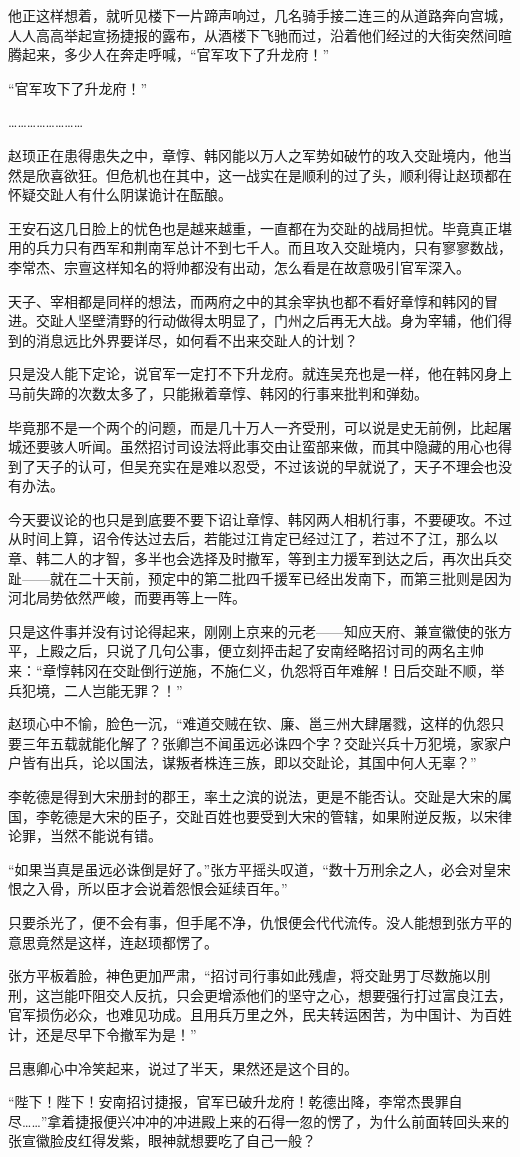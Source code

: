 他正这样想着，就听见楼下一片蹄声响过，几名骑手接二连三的从道路奔向宫城，人人高高举起宣扬捷报的露布，从酒楼下飞驰而过，沿着他们经过的大街突然间暄腾起来，多少人在奔走呼喊，“官军攻下了升龙府！”

“官军攻下了升龙府！”

……………………

赵顼正在患得患失之中，章惇、韩冈能以万人之军势如破竹的攻入交趾境内，他当然是欣喜欲狂。但危机也在其中，这一战实在是顺利的过了头，顺利得让赵顼都在怀疑交趾人有什么阴谋诡计在酝酿。

王安石这几日脸上的忧色也是越来越重，一直都在为交趾的战局担忧。毕竟真正堪用的兵力只有西军和荆南军总计不到七千人。而且攻入交趾境内，只有寥寥数战，李常杰、宗亶这样知名的将帅都没有出动，怎么看是在故意吸引官军深入。

天子、宰相都是同样的想法，而两府之中的其余宰执也都不看好章惇和韩冈的冒进。交趾人坚壁清野的行动做得太明显了，门州之后再无大战。身为宰辅，他们得到的消息远比外界要详尽，如何看不出来交趾人的计划？

只是没人能下定论，说官军一定打不下升龙府。就连吴充也是一样，他在韩冈身上马前失蹄的次数太多了，只能揪着章惇、韩冈的行事来批判和弹劾。

毕竟那不是一个两个的问题，而是几十万人一齐受刑，可以说是史无前例，比起屠城还要骇人听闻。虽然招讨司设法将此事交由让蛮部来做，而其中隐藏的用心也得到了天子的认可，但吴充实在是难以忍受，不过该说的早就说了，天子不理会也没有办法。

今天要议论的也只是到底要不要下诏让章惇、韩冈两人相机行事，不要硬攻。不过从时间上算，诏令传达过去后，若能过江肯定已经过江了，若过不了江，那么以章、韩二人的才智，多半也会选择及时撤军，等到主力援军到达之后，再次出兵交趾——就在二十天前，预定中的第二批四千援军已经出发南下，而第三批则是因为河北局势依然严峻，而要再等上一阵。

只是这件事并没有讨论得起来，刚刚上京来的元老——知应天府、兼宣徽使的张方平，上殿之后，只说了几句公事，便立刻抨击起了安南经略招讨司的两名主帅来：“章惇韩冈在交趾倒行逆施，不施仁义，仇怨将百年难解！日后交趾不顺，举兵犯境，二人岂能无罪？！”

赵顼心中不愉，脸色一沉，“难道交贼在钦、廉、邕三州大肆屠戮，这样的仇怨只要三年五载就能化解了？张卿岂不闻虽远必诛四个字？交趾兴兵十万犯境，家家户户皆有出兵，论以国法，谋叛者株连三族，即以交趾论，其国中何人无辜？”

李乾德是得到大宋册封的郡王，率土之滨的说法，更是不能否认。交趾是大宋的属国，李乾德是大宋的臣子，交趾百姓也要受到大宋的管辖，如果附逆反叛，以宋律论罪，当然不能说有错。

“如果当真是虽远必诛倒是好了。”张方平摇头叹道，“数十万刑余之人，必会对皇宋恨之入骨，所以臣才会说着怨恨会延续百年。”

只要杀光了，便不会有事，但手尾不净，仇恨便会代代流传。没人能想到张方平的意思竟然是这样，连赵顼都愣了。

张方平板着脸，神色更加严肃，“招讨司行事如此残虐，将交趾男丁尽数施以刖刑，这岂能吓阻交人反抗，只会更增添他们的坚守之心，想要强行打过富良江去，官军损伤必众，也难见功成。且用兵万里之外，民夫转运困苦，为中国计、为百姓计，还是尽早下令撤军为是！”

吕惠卿心中冷笑起来，说过了半天，果然还是这个目的。

“陛下！陛下！安南招讨捷报，官军已破升龙府！乾德出降，李常杰畏罪自尽……”拿着捷报便兴冲冲的冲进殿上来的石得一忽的愣了，为什么前面转回头来的张宣徽脸皮红得发紫，眼神就想要吃了自己一般？

